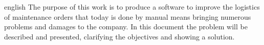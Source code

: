 \begin{resumo}[Abstract]
 \begin{otherlanguage*}{english}
	The purpose of this work is to produce a software to improve the logistics of maintenance orders that today is done by manual means bringing numerous problems and damages to the company. In this document the problem will be described and presented, clarifying the objectives and showing a solution.

   \vspace{\onelineskip}
 
   \noindent 

 \end{otherlanguage*}
\end{resumo}

\listoffigures*
\cleardoublepage


\cleardoublepage
